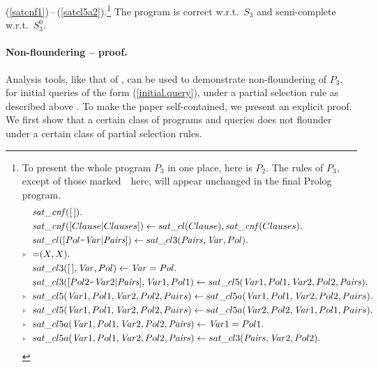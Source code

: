 \documentclass{tlp}
\newcommand*{\mydash}{{\mbox{\tt-}}}
\begin{document}
(\ref{satcnf1})\,--\,(\ref{satcl5a2}).\footnote{\newcommand{\mysymbol}{\raisebox{1pt}{\tiny$\triangleright$}}\setcounter{rememberequation}{\theequation}\setcounter{equation}{6}\label{wholeP2}To present the whole program $P_3$ in one place, here is $P_2$.
The rules of $P_3$,
    except of those marked~\mysymbol\ here,
    will appear unchanged in the final Prolog program.
\begin{align}
&
      {\it sat\_c n f}([\,]).   \\
&
      {\it sat\_c n f}([Clause | Clauses]) \gets
        sat\_cl(Clause),
        {\it sat\_c n f}(Clauses). 
      \\
&
    sat\_cl([Pol\mydash {\it Var} | {\it Pairs}]) \gets sat\_cl3({\it Pairs}, {\it Var}, Pol). 
      \\
\mysymbol\ \ &
{=}(X,X).
      \\
&
        sat\_cl3([\,], {\it Var}, Pol) \gets {\it Var} = Pol. 
\\
&
      sat\_cl3([Pol2\mydash {\it Var}2 | {\it Pairs}], {\it Var}1, Pol1) \gets 
         sat\_cl5({\it Var}1, Pol1, {\it Var}2, Pol2, {\it Pairs}). 
    \\
\mysymbol\ \ &
sat\_cl5({\it Var}1, Pol1, {\it Var}2, Pol2, Pairs) \gets
sat\_cl5a({\it Var}1, Pol1, {\it Var}2, Pol2, Pairs).
\\
\mysymbol\ \ &
sat\_cl5({\it Var}1, Pol1, {\it Var}2, Pol2, Pairs) \gets 
sat\_cl5a({\it Var}2, Pol2, {\it Var}1, Pol1, Pairs).
\\
\mysymbol\ \ &
sat\_cl5a({\it Var}1, Pol1, {\it Var}2, Pol2, {\it Pairs}) \gets {\it Var}1 = Pol1.
\\
\mysymbol\ \ &
sat\_cl5a({\it Var}1, Pol1, {\it Var}2, Pol2, {\it Pairs}) \gets sat\_cl3( {\it Pairs}, {\it Var}2, Pol2).
    \end{align}
\vspace*{-2\belowdisplayskip}
\setcounter{equation}{\therememberequation}} The program is correct w.r.t.\ $S_3$ and semi-complete w.r.t.\  $S_3^0$.



\paragraph{Non-floundering -- proof.}
Analysis tools, like that of \cite{king.non-suspension2008},
can be used to demonstrate non-floundering of $P_3$, 
for initial queries of the form (\ref{initial.query}),
under a partial selection rule as described above \cite{king.private2012}.
To make the paper self-contained, we present an explicit proof.
We first show that a certain class of programs and queries does not flounder
under a certain class of partial selection rules.
\end{document}
